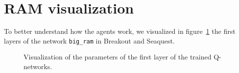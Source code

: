 \section{RAM visualization}
To better understand how the agents work, we visualized in figure~\ref{fig:ram-vis} the first layers of the network \texttt{big\_ram} in Breakout and Seaquest. 

\begin{figure}[!h]
\centering
{}
\hspace{15pt}
\caption{Visualization of the parameters of the first layer of the trained Q-networks.}
\label{fig:ram-vis}
\end{figure}

